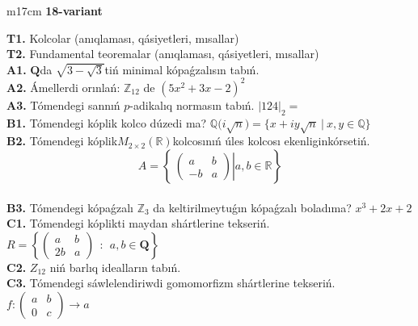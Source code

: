 \documentclass{article}
\begin{document}
\begin{tabular}{m{17cm}}
\textbf{18-variant}
\newline

\textbf{T1.} Kolcolar (anıqlaması, qásiyetleri, mısallar) \\
\textbf{T2.} Fundamental teoremalar (anıqlaması, qásiyetleri, mısallar) \\
\textbf{A1.} \(\mathbf{Q}\)da \(\sqrt{3 - \sqrt{3}}\)tiń minimal kópaǵzalısın tabıń. \\
\textbf{A2.} Ámellerdi orınlań: \(\mathbb{Z}_{12}\) de \(\left( 5x^{2} + 3x - 2 \right)^{2}\) \\
\textbf{A3.} Tómendegi sannıń \(p\)-adikalıq normasın tabıń. \(|124|_{2} =\) \\
\textbf{B1.} Tómendegi kóplik kolco dúzedi ma? \(\mathbb{Q(}i\sqrt{n}) = \{ x + iy\sqrt{n}\ |\ x,y \in \mathbb{Q}\}\) \\
\textbf{B2.} Tómendegi kóplik\(M_{2 \times 2}\left( \mathbb{R} \right)\)kolcosınıń úles kolcosı ekenliginkórsetiń.
\[A = \left\{ \left. \ \begin{pmatrix}
a & b \\
 - b & a
\end{pmatrix} \right|a,b\mathbb{\in R} \right\}\] \\
\textbf{B3.} Tómendegi kópaǵzalı \(\mathbb{Z}_{3}\) da keltirilmeytuǵın kópaǵzalı boladıma? \(x^{3} + 2x + 2\) \\
\textbf{C1.} Tómendegi kóplikti maydan shártlerine tekseriń. \(R = \left\{ \begin{pmatrix}
a & b \\
2b & a
\end{pmatrix}\ \ :\ \ a,b \in \mathbf{Q} \right\}\) \\
\textbf{C2.} \(Z_{12}\) niń barlıq idealların tabıń. \\
\textbf{C3.} Tómendegi sáwlelendiriwdi gomomorfizm shártlerine tekseriń. \(f:\begin{pmatrix}
a & b \\
0 & c
\end{pmatrix} \rightarrow a\) \\

\end{tabular}
\vspace{1cm}
\end{document}
